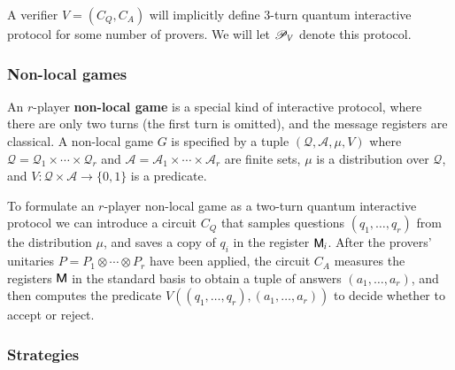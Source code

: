 A verifier $V = (C_Q,C_A)$ will implicitly define $3$-turn quantum interactive protocol for some number of provers. We will let $\mathscr{P}_V$ denote this protocol.



\subsubsection{Non-local games} 


An $r$-player \textbf{non-local game} is a special kind of interactive protocol, where there are only two turns (the first turn is omitted), and the message registers are classical. A non-local game $G$ is specified by a tuple $(\mathcal{Q},\mathcal{A},\mu,V)$ where $\mathcal{Q} = \mathcal{Q}_1 \times \cdots \times \mathcal{Q}_r$ and $\mathcal{A} = \mathcal{A}_1 \times \cdots \times \mathcal{A}_r$ are finite sets, $\mu$ is a distribution over $\mathcal{Q}$, and $V: \mathcal{Q} \times \mathcal{A} \to \{0,1\}$ is a predicate. 


To formulate an $r$-player non-local game as a two-turn quantum interactive protocol we can introduce a circuit $C_Q$ that samples questions $(q_1,\ldots,q_r)$ from the distribution $\mu$, and saves a copy of $q_i$ in the register ${\mathsf{M}}_i$. After the provers' unitaries $P = P_1 \otimes \cdots \otimes P_r$ have been applied, the circuit $C_A$ measures the registers ${\mathsf{M}}$  in the standard basis to obtain a tuple of answers $(a_1,\ldots,a_r)$, and then computes the predicate $V((q_1,\ldots,q_r),(a_1,\ldots,a_r))$ to decide whether to accept or reject.




\subsubsection{Strategies}

